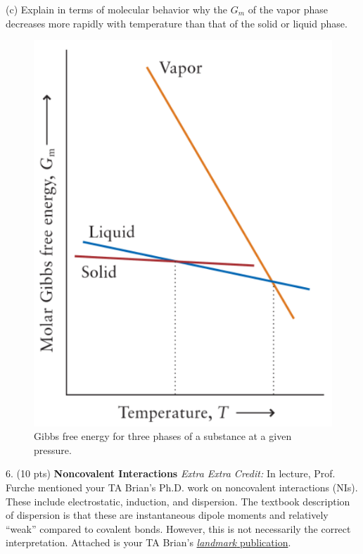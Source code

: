 \documentclass[11pt]{article}
\begin{document}
(c) Explain in terms of molecular behavior why the $G_m$ of the vapor phase decreases more rapidly
with temperature than that of the solid or liquid phase.

\begin{figure}[hbpt]
  \centering
  \includegraphics[scale=0.3]{gibbs_phases.png}
  \caption{Gibbs free energy for three phases of a substance at a given
    pressure.}
  \label{fig:gibbs_phase}
\end{figure}


\pagebreak

6. (10 pts) \textbf{Noncovalent Interactions} \textit{Extra Extra Credit:}
In lecture, Prof. Furche mentioned your TA Brian's Ph.D. work on noncovalent interactions (NIs).
These include electrostatic, induction, and dispersion. The textbook description of
dispersion is that these are instantaneous dipole moments and relatively ``weak'' compared to
covalent bonds. However, this is not necessarily the correct interpretation. Attached is your TA Brian's
\href{https://doi.org/10.1021/acs.jctc.9b01176}{\textit{landmark} publication}.
\end{document}
